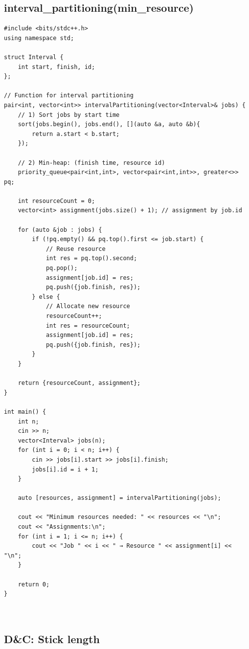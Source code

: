\documentclass[a4paper,10pt,oneside]{article}
\begin{document}
\begin{multicols*}{\COLS}
\subsection{interval_partitioning(min_resource)}
\begin{lstlisting}
#include <bits/stdc++.h>
using namespace std;

struct Interval {
    int start, finish, id;
};

// Function for interval partitioning
pair<int, vector<int>> intervalPartitioning(vector<Interval>& jobs) {
    // 1) Sort jobs by start time
    sort(jobs.begin(), jobs.end(), [](auto &a, auto &b){
        return a.start < b.start;
    });

    // 2) Min-heap: (finish time, resource id)
    priority_queue<pair<int,int>, vector<pair<int,int>>, greater<>> pq;

    int resourceCount = 0;
    vector<int> assignment(jobs.size() + 1); // assignment by job.id

    for (auto &job : jobs) {
        if (!pq.empty() && pq.top().first <= job.start) {
            // Reuse resource
            int res = pq.top().second;
            pq.pop();
            assignment[job.id] = res;
            pq.push({job.finish, res});
        } else {
            // Allocate new resource
            resourceCount++;
            int res = resourceCount;
            assignment[job.id] = res;
            pq.push({job.finish, res});
        }
    }

    return {resourceCount, assignment};
}

int main() {
    int n;
    cin >> n;
    vector<Interval> jobs(n);
    for (int i = 0; i < n; i++) {
        cin >> jobs[i].start >> jobs[i].finish;
        jobs[i].id = i + 1;
    }

    auto [resources, assignment] = intervalPartitioning(jobs);

    cout << "Minimum resources needed: " << resources << "\n";
    cout << "Assignments:\n";
    for (int i = 1; i <= n; i++) {
        cout << "Job " << i << " → Resource " << assignment[i] << "\n";
    }

    return 0;
}



\end{lstlisting}
\subsection{D&C: Stick length }
\begin{lstlisting}


\end{lstlisting}
\end{multicols*}
\end{document}
